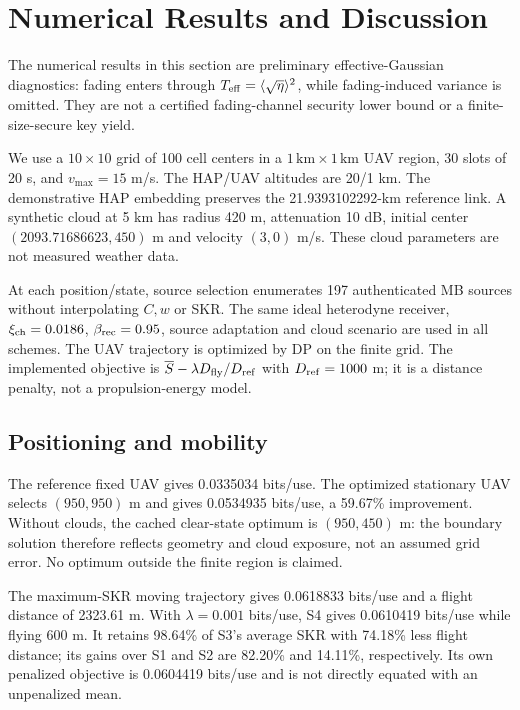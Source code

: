 
\section{Numerical Results and Discussion}\label{sec:numerical_mobility}

The numerical results in this section are preliminary effective-Gaussian diagnostics: fading enters through $T_{\rm eff}=\langle\sqrt{\eta}\rangle^2$, while fading-induced variance is omitted. They are not a certified fading-channel security lower bound or a finite-size-secure key yield.

We use a $10\times10$ grid of 100 cell centers in a $1\,\mathrm{km}\times1\,\mathrm{km}$ UAV region, 30 slots of 20 s, and $v_{\max}=15$ m/s. The HAP/UAV altitudes are 20/1 km. The demonstrative HAP embedding preserves the 21.9393102292-km reference link. A synthetic cloud at 5 km has radius 420 m, attenuation 10 dB, initial center $(2093.71686623,450)$ m and velocity $(3,0)$ m/s. These cloud parameters are not measured weather data.

At each position/state, source selection enumerates 197 authenticated MB sources without interpolating $C,w$ or SKR. The same ideal heterodyne receiver, $\xi_{\rm ch}=0.0186$, $\beta_{\rm rec}=0.95$, source adaptation and cloud scenario are used in all schemes. The UAV trajectory is optimized by DP on the finite grid. The implemented objective is $\overline S-\lambda D_{\rm fly}/D_{\rm ref}$ with $D_{\rm ref}=1000$ m; it is a distance penalty, not a propulsion-energy model.





\subsection{Positioning and mobility}

The reference fixed UAV gives 0.0335034 bits/use. The optimized stationary UAV selects $(950,950)$ m and gives 0.0534935 bits/use, a 59.67\% improvement. Without clouds, the cached clear-state optimum is $(950,450)$ m: the boundary solution therefore reflects geometry and cloud exposure, not an assumed grid error. No optimum outside the finite region is claimed.

The maximum-SKR moving trajectory gives 0.0618833 bits/use and a flight distance of 2323.61 m. With $\lambda=0.001$ bits/use, S4 gives 0.0610419 bits/use while flying 600 m. It retains 98.64\% of S3's average SKR with 74.18\% less flight distance; its gains over S1 and S2 are 82.20\% and 14.11\%, respectively. Its own penalized objective is 0.0604419 bits/use and is not directly equated with an unpenalized mean.

